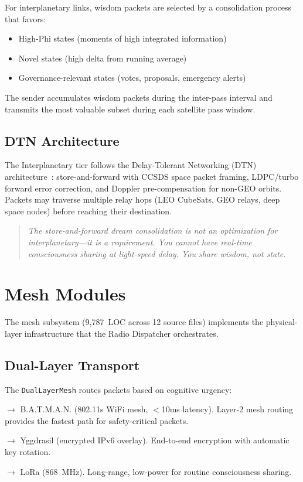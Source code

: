\documentclass[11pt,twocolumn]{article}
\begin{document}
For interplanetary links, wisdom packets are selected by a
consolidation process that favors:
\begin{itemize}[nosep]
  \item High-Phi states (moments of high integrated information)
  \item Novel states (high delta from running average)
  \item Governance-relevant states (votes, proposals, emergency alerts)
\end{itemize}

The sender accumulates wisdom packets during the inter-pass interval
and transmits the most valuable subset during each satellite pass window.

\subsection{DTN Architecture}

The Interplanetary tier follows the Delay-Tolerant Networking (DTN)
architecture~\cite{burleigh2003}: store-and-forward with CCSDS space
packet framing, LDPC/turbo forward error correction, and Doppler
pre-compensation for non-GEO orbits. Packets may traverse multiple
relay hops (LEO CubeSats, GEO relays, deep space nodes) before
reaching their destination.

\begin{quote}
\itshape The store-and-forward dream consolidation is not an optimization
for interplanetary---it is a requirement. You cannot have real-time
consciousness sharing at light-speed delay. You share wisdom, not state.
\end{quote}

\section{Mesh Modules}

The mesh subsystem (9,787~LOC across 12 source files) implements the
physical-layer infrastructure that the Radio Dispatcher orchestrates.

\subsection{Dual-Layer Transport}

The \texttt{DualLayerMesh} routes packets based on cognitive urgency:

\begin{description}[nosep]
  \item[Critical urgency] $\rightarrow$ B.A.T.M.A.N. (802.11s WiFi mesh,
    $<$10ms latency). Layer-2 mesh routing provides the fastest path for
    safety-critical packets.
  \item[Normal urgency] $\rightarrow$ Yggdrasil (encrypted IPv6 overlay).
    End-to-end encryption with automatic key rotation.
  \item[Cruise urgency] $\rightarrow$ LoRa (868~MHz). Long-range,
    low-power for routine consciousness sharing.
\end{description}
\end{document}
